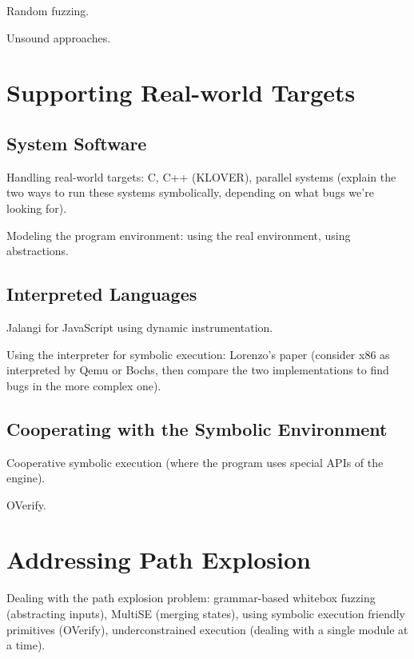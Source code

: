 Random fuzzing.

Unsound approaches.


\section{Supporting Real-world Targets}
\label{sec:relwork:targets}

\subsection{System Software}

Handling real-world targets: C, C++ (KLOVER), parallel systems (explain the two ways to run these systems symbolically, depending on what bugs we're looking for).

Modeling the program environment: using the real environment, using abstractions.

\subsection{Interpreted Languages}

Jalangi for JavaScript using dynamic instrumentation.

Using the interpreter for symbolic execution: Lorenzo's paper (consider x86 as interpreted by Qemu or Bochs, then compare the two implementations to find bugs in the more complex one).

\subsection{Cooperating with the Symbolic Environment}

Cooperative symbolic execution (where the program uses special APIs of the engine).

OVerify.


\section{Addressing Path Explosion}
\label{sec:relwork:pathexpl}

Dealing with the path explosion problem: grammar-based whitebox fuzzing (abstracting inputs), MultiSE (merging states), using symbolic execution friendly primitives (OVerify), underconstrained execution (dealing with a single module at a time).

